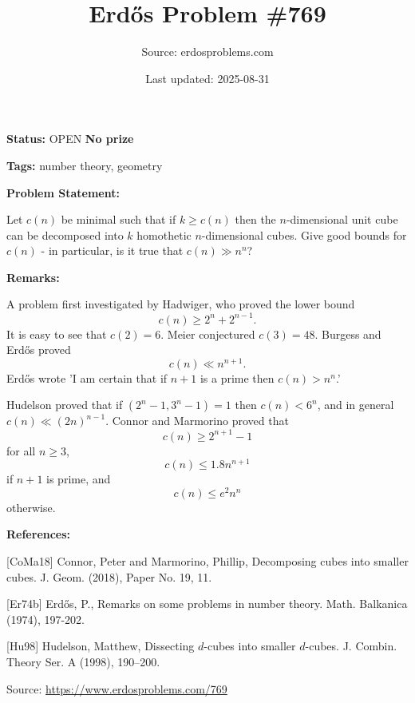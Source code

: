 \documentclass{article}
\title{Erd\H{o}s Problem \#769}
\date{Last updated: 2025-08-31}
\author{Source: erdosproblems.com}
\begin{document}
\maketitle

\noindent\textbf{Status:} OPEN \quad \textbf{No prize}

\noindent\textbf{Tags:} number theory, geometry

\medskip
\noindent\textbf{Problem Statement:}

Let $c(n)$ be minimal such that if $k\geq c(n)$ then the $n$-dimensional unit cube can be decomposed into $k$ homothetic $n$-dimensional cubes. Give good bounds for $c(n)$ - in particular, is it true that $c(n) \gg n^n$?

\bigskip
\noindent\textbf{Remarks:}

A problem first investigated by Hadwiger, who proved the lower bound\[c(n) \geq 2^n+2^{n-1}.\]It is easy to see that $c(2)=6$. Meier conjectured $c(3)=48$. Burgess and Erd\H{o}s \cite{Er74b} proved\[c(n) \ll n^{n+1}.\]Erd\H{o}s wrote 'I am certain that if $n+1$ is a prime then $c(n)>n^n$.'

Hudelson \cite{Hu98} proved that if $(2^n-1,3^n-1)=1$ then $c(n) < 6^n$, and in general $c(n) \ll (2n)^{n-1}$. Connor and Marmorino \cite{CoMa18} proved that\[c(n) \geq 2^{n+1}-1\]for all $n\geq 3$,\[c(n) \leq 1.8n^{n+1}\]if $n+1$ is prime, and\[c(n) \leq e^2n^n\]otherwise.

\bigskip
\noindent\textbf{References:}

[CoMa18] Connor, Peter and Marmorino, Phillip, Decomposing cubes into smaller cubes. J. Geom. (2018), Paper No. 19, 11.
 
 [Er74b] Erd\H{o}s, P., Remarks on some problems in number theory. Math. Balkanica (1974), 197-202.
 
 [Hu98] Hudelson, Matthew, Dissecting {$d$}-cubes into smaller {$d$}-cubes. J. Combin. Theory Ser. A (1998), 190--200.

\bigskip
\noindent\small{Source: \url{https://www.erdosproblems.com/769}}
\end{document}
